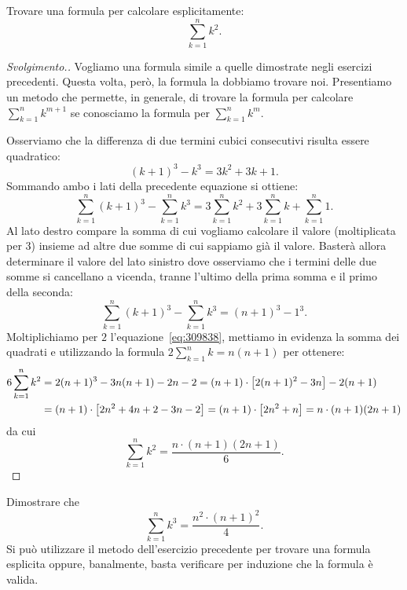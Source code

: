 \begin{exercise}
\label{ex:somma_quadrati}
  Trovare una formula per calcolare esplicitamente:
  \[
    \sum_{k=1}^n k^2.
  \]
\end{exercise}
\begin{proof}[Svolgimento.]
Vogliamo una formula simile a quelle dimostrate negli esercizi 
precedenti. 
Questa volta, però, la formula la dobbiamo trovare noi.
Presentiamo un metodo che permette, in generale, 
di trovare la formula per calcolare $\sum_{k=1}^n k^{m+1}$
se conosciamo la formula per $\sum_{k=1}^n k^m$.

Osserviamo che la differenza 
di due termini cubici consecutivi risulta essere quadratico:
\[
(k+1)^3 - k^3 = 3 k^2 + 3k + 1.  
\]
Sommando ambo i lati della precedente equazione si ottiene:
\begin{equation}\label{eq:309838}
\sum_{k=1}^n (k+1)^3 - \sum_{k=1}^n k^3 
= 3\sum_{k=1}^n k^2+3\sum_{k=1}^n k+\sum_{k=1}^n 1.
\end{equation}
Al lato destro compare la somma di cui vogliamo calcolare il valore 
(moltiplicata per $3$)
insieme ad altre due somme di cui sappiamo già il valore. 
Basterà allora determinare il valore del lato sinistro dove 
osserviamo che i termini delle due somme si cancellano 
a vicenda,
tranne l'ultimo della prima somma 
e il primo della seconda: 
\[
  \sum_{k=1}^n(k+1)^3 - \sum_{k=1}^n k^3 = (n+1)^3 - 1^3.
\]
Moltiplichiamo per $2$ l'equazione~\eqref{eq:309838},
mettiamo in evidenza la somma dei quadrati e 
utilizzando la formula $2\sum_{k=1}^n k = n(n+1)$
per ottenere:
\begin{align*}
  6 \sum_{k=1}^n k^2 
  &=  2(n+1)^3 - 3 n(n+1) - 2n - 2
  = (n+1) \cdot {\left[ 2(n+1)^2 - 3n \right]} - 2(n+1)\\
  &= (n+1)\cdot {\left[ 2n^2+4n+2 -3n - 2 \right]}
   = (n+1)\cdot {\left[ 2n^2+n \right]} 
   = n \cdot (n+1)(2n+1)
\end{align*}
da cui 
\begin{equation}\label{eq:somma_quadrati}
  \sum_{k=1}^n k^2 = \frac{n\cdot (n+1)(2n+1)}{6}.
\end{equation}
\end{proof}

\begin{exercise}
Dimostrare che 
\[
  \sum_{k=1}^n k^3 = \frac{n^2\cdot (n+1)^2}{4}.
\]
Si può utilizzare il metodo dell'esercizio precedente per trovare una formula esplicita 
oppure, banalmente, basta verificare per induzione che la formula è valida.
\end{exercise}

